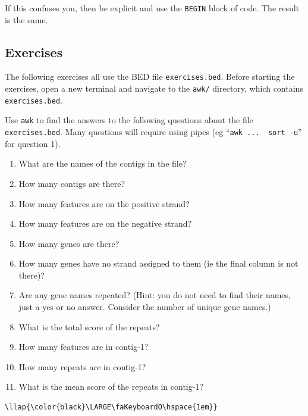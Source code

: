 \documentclass[11pt]{article}
\providecommand{\tightlist}{%
      \setlength{\itemsep}{0pt}\setlength{\parskip}{0pt}}
\begin{document}
    If this confuses you, then be explicit and use the \texttt{BEGIN} block
of code. The result is the same.

    \hypertarget{exercises}{%
\subsection{Exercises}\label{exercises}}

The following exercises all use the BED file \texttt{exercises.bed}.
Before starting the exercises, open a new terminal and navigate to the
\texttt{awk/} directory, which contains \texttt{exercises.bed}.

Use \texttt{awk} to find the answers to the following questions about
the file \texttt{exercises.bed}. Many questions will require using pipes
(eg ``\texttt{awk\ ...\ \textbar{}\ sort\ -u}'' for question 1).

\begin{enumerate}
\def\labelenumi{\arabic{enumi}.}
\tightlist
\item
  What are the names of the contigs in the file?
\item
  How many contigs are there?
\item
  How many features are on the positive strand?
\item
  How many features are on the negative strand?
\item
  How many genes are there?
\item
  How many genes have no strand assigned to them (ie the final column is
  not there)?
\item
  Are any gene names repeated? (Hint: you do not need to find their
  names, just a yes or no answer. Consider the number of unique gene
  names.)
\item
  What is the total score of the repeats?
\item
  How many features are in contig-1?
\item
  How many repeats are in contig-1?
\item
  What is the mean score of the repeats in contig-1?
\end{enumerate}

\begin{terminalinput}
\begin{Verbatim}[commandchars=\\\{\}]
\llap{\color{black}\LARGE\faKeyboardO\hspace{1em}}
\end{Verbatim}
\end{terminalinput}
\end{document}
